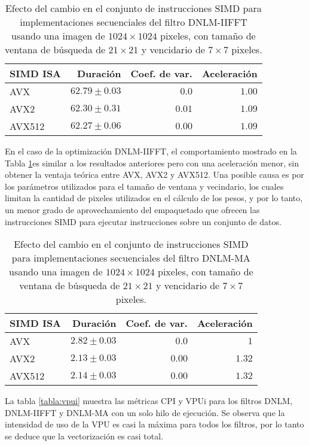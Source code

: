 \begin{table}
\protect\caption[Efecto de vectorización con instrucciones SIMD para el filtro DNLM-IIFFT]{Efecto del cambio en el conjunto de instrucciones SIMD para implementaciones secuenciales del filtro DNLM-IIFFT usando una imagen de  $1024 \times 1024$ pixeles, con tama\~no de ventana de búsqueda de $21 \times 21$ y vencidario de $7 \times 7$ pixeles. \label{tabla:vec_dnlm_iifft}}
\centering
\begin{tabular}{lrrr}
SIMD ISA & Duración \left[s\right]& Coef. de var. & Aceleración \left[x\right] \tabularnewline
\hline
AVX & $62.79\pm0.03$ & $0.0$ & $1.00$\tabularnewline
AVX2 & $62.30\pm0.31$ & $0.01$ & $1.09$\tabularnewline
AVX512 & $62.27\pm 0.06$ & $0.00$ & $1.09$ \tabularnewline
\end{tabular}
\end{table}


En el caso de la optimización DNLM-IIFFT, el comportamiento mostrado en la Tabla \ref{tabla:vec_dnlm_iifft}es similar a los resultados anteriores pero con una aceleración menor, sin obtener la ventaja teórica entre AVX, AVX2 y AVX512. Una posible causa es por los parámetros utilizados para el tama\~no de ventana y vecindario, los cuales limitan la cantidad de pixeles utilizados en el cálculo de los pesos, y por lo tanto, un menor grado de aprovechamiento del empaquetado que ofrecen las instrucciones SIMD para ejecutar instrucciones sobre un conjunto de datos.

\begin{table}
\protect\caption[Efecto de vectorización con instrucciones SIMD para el filtro DNLM-MA]{Efecto del cambio en el conjunto de instrucciones SIMD para implementaciones secuenciales del filtro DNLM-MA usando una imagen de  $1024 \times 1024$ pixeles, con tama\~no de ventana de búsqueda de $21 \times 21$ y vencidario de $7 \times 7$ pixeles. \label{tabla:vec_dnlm_MA}}
\centering
\begin{tabular}{lrrr}
SIMD ISA & Duración \left[s\right]& Coef. de var. & Aceleración \left[x\right] \tabularnewline
\hline
AVX & $2.82\pm0.03$ & $0.0$ & $1$\tabularnewline
AVX2 & $2.13\pm0.03$ & $0.00$ & $1.32$\tabularnewline
AVX512 & $2.14\pm 0.03$ & $0.00$ & $1.32$ \tabularnewline
\end{tabular}
\end{table}

La tabla \ref{tabla:vpui} muestra las métricas CPI y VPUi para los filtros DNLM, DNLM-IIFFT y DNLM-MA con un solo hilo de ejecución. Se observa que la intensidad de uso de la VPU es casi la máxima para todos los filtros, por lo tanto se deduce que la vectorización es casi total.

